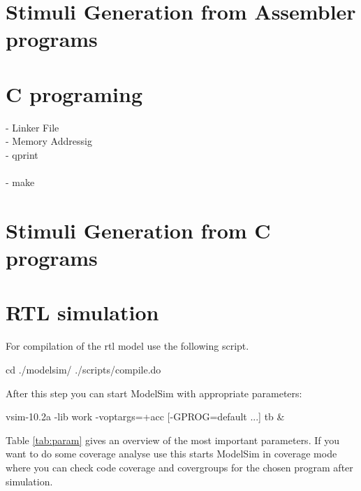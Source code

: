 \section{Stimuli Generation from Assembler programs}

\section{C programing}
- Linker File\\
- Memory Addressig\\
- qprint\\ \\
- make
\section{Stimuli Generation from C programs}

\section{RTL simulation}
For compilation of the \gls{rtl} model use the following script.

\begin{shellenv}
cd ./modelsim/
./scripts/compile.do
\end{shellenv}

After this step you can start ModelSim with appropriate parameters:

\begin{shellenv}
vsim-10.2a -lib work -voptargs=+acc [-GPROG=default ...] tb &
\end{shellenv}

Table \ref{tab:param} gives an overview of the most important parameters. If you want to do some coverage analyse use  this starts ModelSim in coverage mode where you can check code coverage and covergroups for the chosen program after simulation.

